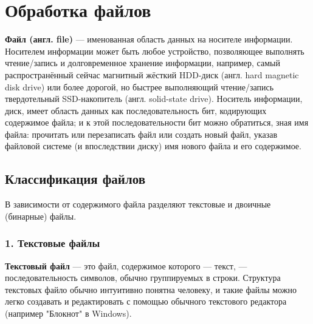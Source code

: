 \documentclass[10pt,a4paper]{report}
\begin{document}
\parindent=1cm
\pagestyle{empty}
\lstset{ language=Pascal, basicstyle=\small\ttfamily, numbers=left, numberstyle=\tiny, stepnumber=1, numbersep=5pt, extendedchars=\true, showstringspaces=false, breakatwhitespace=true, frame=single, keepspaces=true }

\clearpage
\section*{Обработка файлов}
\textbf{Файл (англ. file)} --- именованная область данных на носителе информации. Носителем информации может быть любое устройство, позволяющее выполнять чтение/запись и долговременное хранение информации, например, самый распространённый сейчас магнитный жёсткий HDD-диск (англ. hard magnetic disk drive) или более дорогой, но быстрее выполняющий чтение/запись твердотельный SSD-накопитель (англ. solid-state drive). Носитель информации, диск, имеет область данных как последовательность бит, кодирующих содержимое файла; и к этой последовательности бит можно обратиться, зная имя файла: прочитать или перезаписать файл или создать новый файл, указав файловой системе (и впоследствии диску) имя нового файла и его содержимое.

\subsection*{Классификация файлов}
В зависимости от содержимого файла разделяют текстовые и двоичные (бинарные) файлы.
\subsubsection*{1. Текстовые файлы}
\textbf{Текстовый файл} --- это файл, содержимое которого --- текст, --- последовательность символов, обычно группируемых в строки. Структура текстовых файло обычно интуитивно понятна человеку, и такие файлы можно легко создавать и редактировать с помощью обычного текстового редактора (например "Блокнот" в Windows).
\end{document}
